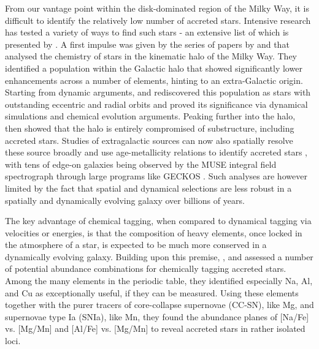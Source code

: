 \documentclass[fleqn,usenatbib]{mnras}
\begin{document}
From our vantage point within the disk-dominated region of the Milky Way, it is difficult to identify the relatively low number of accreted stars. Intensive research has tested a variety of ways to find such stars - an extensive list of which is presented by \citet{Buder2022}. A first impulse was given by the series of papers by \citet{Nissen2010, Nissen2011, Nissen2014} and \citet{Schuster2012} that analysed the chemistry of stars in the kinematic halo of the Milky Way. They identified a population within the Galactic halo that showed significantly lower enhancements across a number of elements, hinting to an extra-Galactic origin. Starting from dynamic arguments, \citet{Belokurov2018} and \citet{Helmi2018} rediscovered this population as stars with outstanding eccentric and radial orbits and proved its significance via dynamical simulations and chemical evolution arguments. Peaking further into the halo, \citet{Naidu2020} then showed that the halo is entirely compromised of substructure, including accreted stars. Studies of extragalactic sources can now also spatially resolve these source broadly and use age-metallicity relations to identify accreted stars \citep{Martig2021}, with tens of edge-on galaxies being observed by the MUSE integral field spectrograph through large programs like GECKOS \citep{GECKOS2023}. Such analyses are however limited by the fact that spatial and dynamical selections are less robust in a spatially and dynamically evolving galaxy over billions of years.

The key advantage of chemical tagging, when compared to dynamical tagging via velocities or energies, is that the composition of heavy elements, once locked in the atmosphere of a star, is expected to be much more conserved in a dynamically evolving galaxy. Building upon this premise, \citet{Hawkins2015}, \citet{Das2020} and \citet{Buder2022} assessed a number of potential abundance combinations for chemically tagging accreted stars. Among the many elements in the periodic table, they identified especially Na, Al, and Cu as exceptionally useful, if they can be measured. Using these elements together with the purer tracers of core-collapse supernovae (CC-SN), like Mg, and supernovae type Ia (SNIa), like Mn, they found the abundance planes of [Na/Fe] vs. [Mg/Mn] and [Al/Fe] vs. [Mg/Mn] to reveal accreted stars in rather isolated loci.
\end{document}
